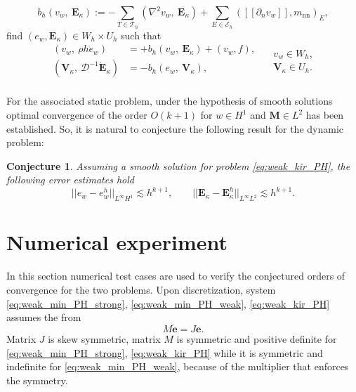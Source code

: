 \documentclass{ifacconf}
\newtheorem{conjecture}{Conjecture}
\begin{document}
\[
b_h(v_w, \ \bm{E}_{\kappa}) := - \sum_{T \in \mathcal{T}_h} ( \nabla^2 v_w, \ \bm{E}_\kappa) + \sum_{E \in \mathcal{E}_h} ([\![\partial_n v_w]\!], m_{\text{nn}})_{E}, 
\]
find $(e_w, \bm{E}_\kappa) \in W_h \times U_h$ such that
\begin{equation}
\label{eq:weak_kir_PH}
\begin{aligned}
(v_w, \ \rho h \dot{e}_w) &= +b_h(v_w, \ \bm{E}_{\kappa}) + (v_w, f), \\ 
(\bm{V}_\kappa, \ \mathcal{D}^{-1} \dot{\bm{E}}_\kappa) &= -b_h(e_w, \ \bm{V}_{\kappa}), \\ 
\end{aligned} \quad
\begin{aligned}
v_w \in W_h, \\
\bm{V}_\kappa \in U_h. \\
\end{aligned}
\end{equation}

For the associated static problem, under the hypothesis of smooth solutions optimal convergence of the order $O(k+1)$ for $w \in H^1$ and $\bm{M} \in L^2$ has been established. So, it is natural to conjecture the following result for the dynamic problem:
\begin{conjecture}
Assuming a smooth solution for problem \eqref{eq:weak_kir_PH}, the following error estimates hold
\begin{equation}
||e_w - e_w^h||_{L^{\infty} H^1} \lesssim h^{k+1}, \qquad
||\bm{E}_\kappa - \bm{E}_\kappa^h||_{L^{\infty} L^2} \lesssim h^{k+1}.
\end{equation}
\end{conjecture}


\section{Numerical experiment}
In this section numerical test cases are used to verify the conjectured orders of convergence for the two problems. Upon discretization, system \eqref{eq:weak_min_PH_strong}, \eqref{eq:weak_min_PH_weak}, \eqref{eq:weak_kir_PH} assumes the from 
\[
M \dot{\bm{e}} = J \bm{e}.
\]
Matrix $J$ is skew symmetric, matrix $M$ is symmetric and positive definite for \eqref{eq:weak_min_PH_strong}, \eqref{eq:weak_kir_PH} while it is symmetric and indefinite for \eqref{eq:weak_min_PH_weak}, because of the multiplier that enforces the symmetry.
\end{document}
